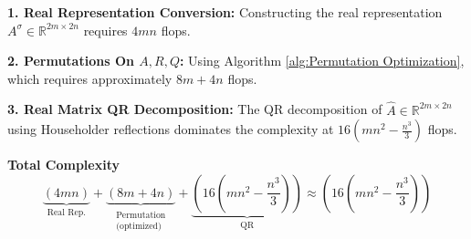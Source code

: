 \documentclass[preprint,12pt]{elsarticle}
\numberwithin{equation}{section}
\begin{document}
\textbf{1. Real Representation Conversion:}
Constructing the real representation \(A^\sigma \in \mathbb{R}^{2m \times 2n}\) requires  \(4mn\) flops. 

\textbf{2. Permutations On $A, R, Q$:}
Using Algorithm \ref{alg:Permutation Optimization}, which requires approximately \(8m+4n\) flops.


\textbf{3. Real Matrix QR Decomposition:}
The QR decomposition of \(\hat{A} \in \mathbb{R}^{2m \times 2n}\) using Householder reflections dominates the complexity at \(16(mn^2-\frac{n^3}{3})\) flops.

\textbf{Total Complexity}
$$
\underbrace{(4mn)}_{\text{Real Rep.}} + \underbrace{(8m+4n)}_{\substack{\text{Permutation} \\ \text{(optimized)}}} + \underbrace{(16(mn^2-\frac{n^3}{3}))}_{\text{QR}} \approx \boxed{(16(mn^2-\frac{n^3}{3}))}
$$  
\end{document}
